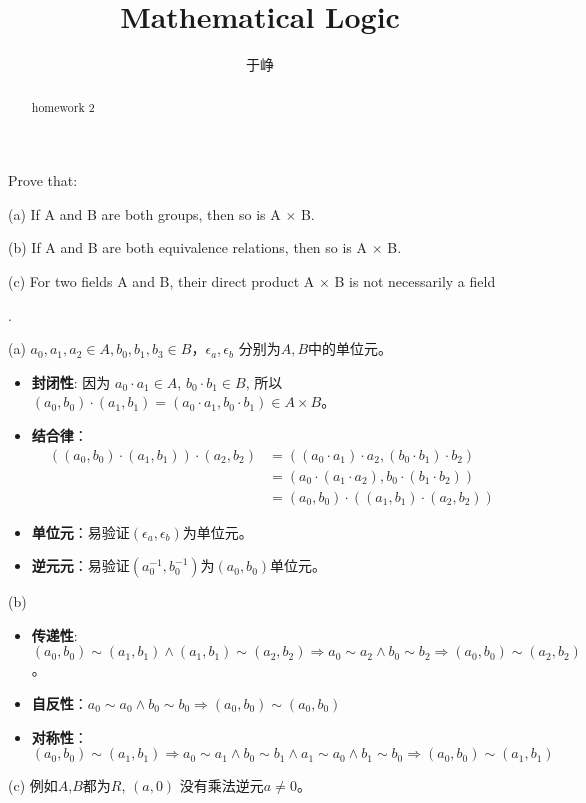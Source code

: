\documentclass{ximera}
\title{Mathematical Logic}
\author{于峥}
\begin{document}
\begin{abstract}
    homework 2
\end{abstract}
\maketitle

\begin{problem}
    Prove that:
    
    (a) If A and B are both groups, then so is A $\times$ B.

    (b) If A and B are both equivalence relations, then so is A $\times$ B.

    (c) For two fields A and B, their direct product A $\times$ B is not necessarily a field

    \begin{solution} .

        (a) 
        $a_0, a_1, a_2 \in A, b_0, b_1, b_3 \in B$，$\epsilon_a, \epsilon_b$ 分别为$A,B$中的单位元。
        \begin{itemize} 
            \item \textbf{封闭性}: 因为 $a_0 \cdot a_1 \in A$, $b_0 \cdot b_1 \in B$, 所以 $(a_0, b_0) \cdot (a_1, b_1) = (a_0 \cdot a_1, b_0 \cdot b_1) \in A \times B$。
            \item \textbf{结合律}：
            $$
            \begin{aligned}
                ((a_0, b_0) \cdot (a_1, b_1)) \cdot (a_2, b_2) 
                &=  ((a_0 \cdot a_1) \cdot a_2, (b_0 \cdot b_1) \cdot b_2)\\
                &=  (a_0 \cdot (a_1 \cdot a_2), b_0 \cdot (b_1 \cdot b_2))\\
                &=  (a_0, b_0) \cdot ((a_1, b_1) \cdot (a_2, b_2))
            \end{aligned}
            $$
            \item \textbf{单位元}：易验证$(\epsilon_a, \epsilon_b)$为单位元。
            \item \textbf{逆元元}：易验证$(a_0^{-1}, b_0^{-1})$为$(a_0, b_0)$单位元。
        \end{itemize}
        (b)
        \begin{itemize}
            \item \textbf{传递性}: 
            $(a_0, b_0) \sim (a_1, b_1) \land (a_1, b_1) \sim (a_2, b_2) \Rightarrow a_0 \sim a_2 \land b_0 \sim b_2 \Rightarrow (a_0, b_0) \sim (a_2, b_2)$。
            \item \textbf{自反性}：$a_0 \sim a_0 \land b_0 \sim b_0 \Rightarrow (a_0, b_0) \sim (a_0, b_0)$
            \item \textbf{对称性}：$(a_0, b_0) \sim (a_1, b_1) \Rightarrow a_0 \sim a_1 \land b_0 \sim b_1 \land a_1 \sim a_0 \land b_1 \sim b_0 \Rightarrow (a_0, b_0) \sim (a_1, b_1)$
        \end{itemize}
        (c) 
        例如$A$,$B$都为$R$, $(a, 0)$ 没有乘法逆元$a \neq 0$。
    \end{solution}
\end{problem}
\end{document}
